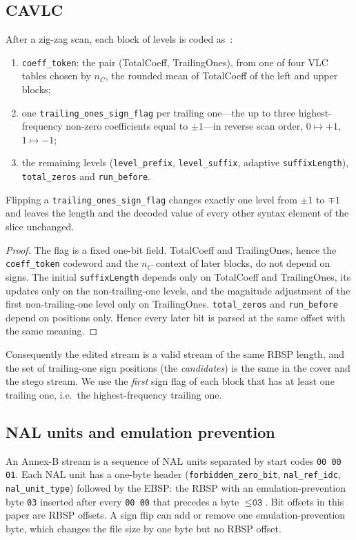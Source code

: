 \subsection{CAVLC}
After a zig-zag scan, each block of levels is coded as~\cite{itu_h264,richardson2010h264}:
\begin{enumerate}
\item \texttt{coeff\_token}: the pair (TotalCoeff, TrailingOnes), from one of four VLC tables chosen by $n_C$, the rounded mean of TotalCoeff of the left and upper blocks;
\item one \texttt{trailing\_ones\_sign\_flag} per trailing one---the up to three highest-frequency non-zero coefficients equal to $\pm1$---in reverse scan order, $0\mapsto+1$, $1\mapsto-1$;
\item the remaining levels (\texttt{level\_prefix}, \texttt{level\_suffix}, adaptive \texttt{suffixLength}), \texttt{total\_zeros} and \texttt{run\_before}.
\end{enumerate}

\begin{proposition}
\label{prop:syntax}
Flipping a \texttt{trailing\_ones\_sign\_flag} changes exactly one level from $\pm1$ to $\mp1$ and leaves the length and the decoded value of every other syntax element of the slice unchanged.
\end{proposition}
\begin{proof}
The flag is a fixed one-bit field. TotalCoeff and TrailingOnes, hence the \texttt{coeff\_token} codeword and the $n_C$ context of later blocks, do not depend on signs. The initial \texttt{suffixLength} depends only on TotalCoeff and TrailingOnes, its updates only on the non-trailing-one levels, and the magnitude adjustment of the first non-trailing-one level only on TrailingOnes. \texttt{total\_zeros} and \texttt{run\_before} depend on positions only. Hence every later bit is parsed at the same offset with the same meaning.
\end{proof}

Consequently the edited stream is a valid stream of the same RBSP length, and the set of trailing-one sign positions (the \emph{candidates}) is the same in the cover and the stego stream. We use the \emph{first} sign flag of each block that has at least one trailing one, i.e.\ the highest-frequency trailing one.

\subsection{NAL units and emulation prevention}
An Annex-B stream is a sequence of NAL units separated by start codes \texttt{00\,00\,01}. Each NAL unit has a one-byte header (\texttt{forbidden\_zero\_bit}, \texttt{nal\_ref\_idc}, \texttt{nal\_unit\_type}) followed by the EBSP: the RBSP with an emulation-prevention byte \texttt{03} inserted after every \texttt{00\,00} that precedes a byte $\le\texttt{03}$. Bit offsets in this paper are RBSP offsets. A sign flip can add or remove one emulation-prevention byte, which changes the file size by one byte but no RBSP offset.

